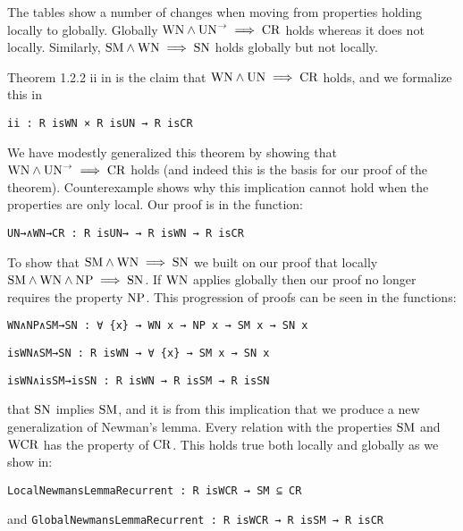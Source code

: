 
The tables show a number of changes when moving from properties holding locally to globally. 
Globally $\mathrm{WN} \land \mathrm{UN}^{\to} \implies \mathrm{CR}$ holds whereas it does not locally. Similarly, $\mathrm{SM} \land \mathrm{WN} \implies \mathrm{SN}$ holds 
globally but not locally. 

Theorem 1.2.2 ii in \terese is the claim that $\mathrm{WN} \land \mathrm{UN} \implies \mathrm{CR}$ holds, and we formalize this in


\verb|ii : R isWN × R isUN → R isCR| \footnotemark[3]

We have modestly generalized this theorem by showing that $\mathrm{WN} \land \mathrm{UN}^{\to} \implies \mathrm{CR}$ holds (and indeed this is the basis for our proof of the theorem). 
Counterexample  shows why this implication cannot hold when the properties are only local. Our proof is in the function:

\verb|UN→∧WN→CR : R isUN→ → R isWN → R isCR| \footnotemark[1]

To show that $\mathrm{SM} \land \mathrm{WN} \implies \mathrm{SN}$ we built on our proof that locally $\mathrm{SM} \land \mathrm{WN} \land \mathrm{NP} \implies \mathrm{SN}$. If $\mathrm{WN}$ applies 
globally then our proof no longer requires the property $\mathrm{NP}$. This progression of proofs can be seen in the functions:

\verb|WN∧NP∧SM→SN : ∀ {x} → WN x → NP x → SM x → SN x| 

\verb|isWN∧SM→SN : R isWN → ∀ {x} → SM x → SN x|

\verb|isWN∧isSM→isSN : R isWN → R isSM → R isSN| \footnotemark[1]


that $\mathrm{SN}$ implies $\mathrm{SM}$, and it is from this implication 
that we produce a new generalization of Newman's lemma. Every relation with the properties 
$\mathrm{SM}$ and $\mathrm{WCR}$ has the property of $\mathrm{CR}$. This holds true both locally and globally as we show in:

\verb|LocalNewmansLemmaRecurrent : R isWCR → SM ⊆ CR| \footnotemark[2]

and \verb|GlobalNewmansLemmaRecurrent : R isWCR → R isSM → R isCR| \footnotemark[2]


